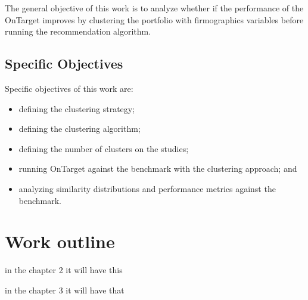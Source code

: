 The general objective of this work is to analyze whether if the performance of the OnTarget improves by clustering the portfolio with firmographics variables before running the recommendation algorithm.

\subsection{Specific Objectives}

Specific objectives of this work are:

\begin{itemize}
    \item defining the clustering strategy;
	\item defining the clustering algorithm;
    \item defining the number of clusters on the studies;
    \item running OnTarget against the benchmark with the clustering approach; and
    \item analyzing similarity distributions and performance metrics against the benchmark.
\end{itemize}


\section{Work outline}

in the chapter 2 it will have this

in the chapter 3 it will have that
 